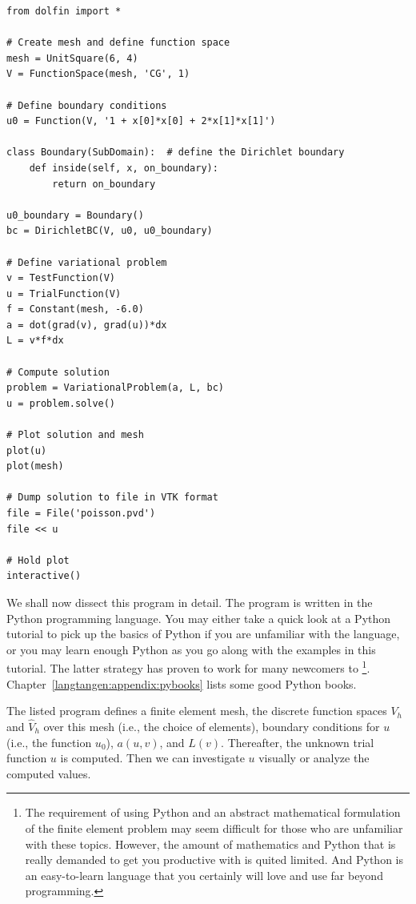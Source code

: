 \begin{Verbatim}[fontsize=\fontsize{10pt}{10pt},tabsize=8,baselinestretch=1.05,
fontfamily=tt,xleftmargin=7mm]
from dolfin import *

# Create mesh and define function space
mesh = UnitSquare(6, 4)
V = FunctionSpace(mesh, 'CG', 1)

# Define boundary conditions
u0 = Function(V, '1 + x[0]*x[0] + 2*x[1]*x[1]')

class Boundary(SubDomain):  # define the Dirichlet boundary
    def inside(self, x, on_boundary):
        return on_boundary

u0_boundary = Boundary()
bc = DirichletBC(V, u0, u0_boundary)

# Define variational problem
v = TestFunction(V)
u = TrialFunction(V)
f = Constant(mesh, -6.0)
a = dot(grad(v), grad(u))*dx
L = v*f*dx

# Compute solution
problem = VariationalProblem(a, L, bc)
u = problem.solve()

# Plot solution and mesh
plot(u)
plot(mesh)

# Dump solution to file in VTK format
file = File('poisson.pvd')
file << u

# Hold plot
interactive()
\end{Verbatim}
\noindent

We shall now dissect this \fenics{} program in detail. The program
is written in the Python programming language.
You may either take a quick look at a Python tutorial \cite{PythonTutorial}
to pick up the basics of Python if you are unfamiliar with the language,
or you may learn enough Python as you go along with the examples in this
tutorial. The latter strategy has proven to work for many newcomers
to \fenics\footnote{The requirement of using Python and an abstract
mathematical formulation of the finite element problem may seem
difficult for those who are unfamiliar with these topics.
However, the amount of mathematics and Python that is really demanded
to get you productive with \fenics{} is quited limited.
And Python is an easy-to-learn language that you certainly will love
and use far beyond \fenics{} programming.}.
Chapter~\ref{langtangen:appendix:pybooks} lists some good Python books.

The listed \fenics{} program defines a finite element mesh, the discrete
function spaces $V_h$ and $\hat{V}_h$ over this mesh (i.e., the choice
of elements), boundary conditions
for $u$ (i.e., the function $u_0$), $a(u,v)$, and $L(v)$.
Thereafter, the unknown
trial function $u$ is computed. Then we can investigate $u$ visually or
analyze the computed values.

